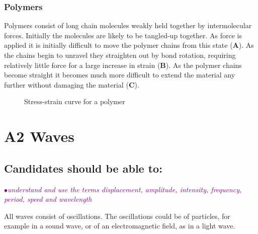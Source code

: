\documentclass[a4paper,11pt,twoside]{memoir}
\newcounter{spec}[chapter]
\newcommand{\spec}[1]{\Needspace{5\baselineskip}\textcolor{purple}{$\bullet$\hspace{0.5cm}\textit{#1}}}
\begin{document}
\subsection{Polymers}

Polymers consist of long chain molecules weakly held together by intermolecular forces. Initially the molecules are likely to be tangled-up together. As force is applied it is initially difficult to move the polymer chains from this state (\textbf{A}). As the chains begin to unravel they straighten out by bond rotation, requiring relatively little force for a large increase in strain (\textbf{B}). As the polymer chains become straight it becomes much more difficult to extend the material any further without damaging the material (\textbf{C}).

\begin{figure}[ht]
    \begin{center}
    \end{center}
    \caption{Stress-strain curve for a polymer}
    \label{stress-strain-polymer}
\end{figure}

\chapter{A2 Waves}
\setcounter{spec}{0}
\section*{Candidates should be able to:}
\spec{understand and use the terms displacement, amplitude, intensity, frequency, period, speed and wavelength}

All waves consist of oscillations. The oscillations could be of particles, for example in a sound wave, or of an electromagnetic field, as in a light wave.
\end{document}
